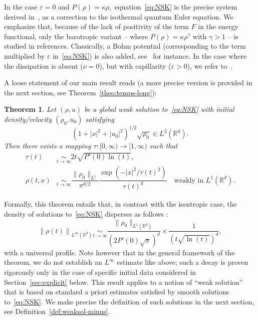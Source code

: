 \documentclass[10pt]{amsart}
\newtheorem{theo}{Theorem}[section]
\theoremstyle{definition}\newtheorem{defi}[theo]{Definition}\newtheorem{rema}[theo]{Remark}\newtheorem{exam}[theo]{Example}\newtheorem{exem}[theo]{Example}\newtheorem{nota}[theo]{Notation}
\newcommand*\R{\mathbb{R}}
\newcommand*\<{\left\langle}
\renewcommand*\>{\right\rangle}
\newcommand*\Eq[2]{\mathop{\sim}\limits_{#1\rightarrow#2}}
\newcommand*\eps{\varepsilon}
\begin{document}
In the case $\varepsilon =0$ and $P(\rho)= \kappa \rho,$ equation~\eqref{eq:NSK} is the precise system derived in~\cite{Bru-Me10}, as a correction to the isothermal quantum Euler equation. We emphasize that, because of the lack of positivity of the term $F$ in the energy functional, only the barotropic variant -- where $P(\rho) = \kappa\rho^{\gamma}$ with $\gamma >1$ -- is studied in references. Classically, a Bohm potential (corresponding to the term multiplied by $\varepsilon$ in~\eqref{eq:NSK}) is also added, see~\cite{AS-comp,Gis-VV15,Jungel,VasseurYu} for instance. In the case where the dissipation is absent ($\nu=0$), but with capillarity ($\eps>0$), we refer to~\cite{BDD07,AnMa09,AnMa12,AuHa17}.

A loose statement of our main result reads (a more precise version is provided in the next section, see Theorem~\ref{theo:temps-long}):

\begin{theo}\label{thm_mainrough}
Let $(\rho,u)$ be a global weak solution to~\eqref{eq:NSK} with initial density/velocity $(\rho_0,u_0)$ satisfying
\[
(1+|x|^2 +|u_0|^2)^{1/2} \sqrt{\rho_0}\in L^2(\mathbb R^d).
\]
Then there exists a mapping $\tau : [0,\infty) \to [1,\infty)$ such that
\begin{align*}
\tau(t) &\Eq t \infty 2t \sqrt{P'(0) \ln(t)}, \\
\rho(t, x) &\Eq t \infty \dfrac{\|\rho_0\|_{L^1}}{\pi^{d/2}}
\dfrac{\exp(-|x|^2/\tau(t)^2)}{\tau(t)^{d}}\quad
\text{weakly in }L^1(\R^d).
\end{align*}
\end{theo}

Formally, this theorem entails that, in contrast with the isentropic case, the density of solutions to~\eqref{eq:NSK} disperses as follows :
\begin{equation*}
\left\| \rho(t)\right\|_{L^\infty(\R^d)}\Eq t \infty
\frac{\|\rho_0\|_{L^1(\R^d)}}{\left(2P'(0)\sqrt{\pi}\right)^d}\times
\frac{1}{\left(t\sqrt{\ln(t)}\right)^d},
\end{equation*}
with a universal profile. Note however that in the general framework of the theorem, we do not establish an $L^\infty$ estimate like above; such a decay is proven rigorously only in the case of specific initial data considered in Section~\ref{sec:explicit} below. This result applies to a notion of ``weak solution'' that is based on standard a priori estimates satisfied by smooth solutions to~\eqref{eq:NSK}. We make precise the definition of such solutions in the next section, see Definition~\ref{def:weaksol-minus}.
\end{document}
